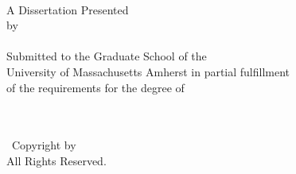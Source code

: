 


\thispagestyle{empty}
\begin{center}
 	\MakeUppercase{\distitle}\\[4.25cm]		%
	A Dissertation Presented\\[0.5cm]
	by\\[0.5cm]
	    \authname\\[3cm]		%
	Submitted to the Graduate School of the\\
	University of Massachusetts Amherst in partial fulfillment\\
	of the requirements for the degree of\\[1.5cm]
	\degreename\\[1cm]		%
	\monthyear\\[1cm]		%
	\programname			%
\end{center}
\newpage

\thispagestyle{empty}
\begin{center}
    \vspace*{18cm}
    \textcopyright~Copyright by \authname~\the\year\\
    All Rights Reserved.
\end{center}
\newpage

